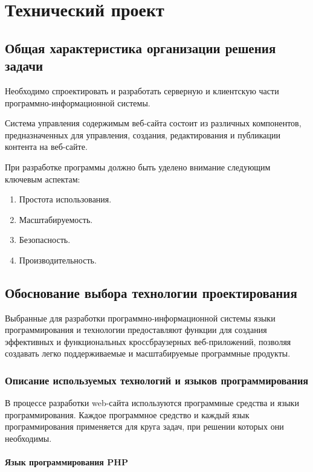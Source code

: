 \section{Технический проект}
\subsection{Общая характеристика организации решения задачи}

Необходимо спроектировать и разработать серверную и клиентскую части программно-информационной системы.

Система управления содержимым веб-сайта состоит из различных компонентов, предназначенных для управления, создания, редактирования и публикации контента на веб-сайте.

При разработке программы должно быть уделено внимание следующим ключевым аспектам:
\begin{enumerate}
	\item Простота использования.
	\item Масштабируемость.
	\item Безопасность.
	\item Производительность.
\end{enumerate}

\subsection{Обоснование выбора технологии проектирования}

Выбранные для разработки программно-информационной системы языки программирования и технологии предоставляют функции для создания эффективных и функциональных кроссбраузерных веб-приложений, позволяя создавать легко поддерживаемые и масштабируемые программные продукты.

\subsubsection{Описание используемых технологий и языков программирования}

В процессе разработки web-сайта используются программные средства и языки программирования. Каждое программное средство и каждый язык программирования применяется для круга задач, при решении которых они необходимы.

\paragraph{Язык программирования PHP}

